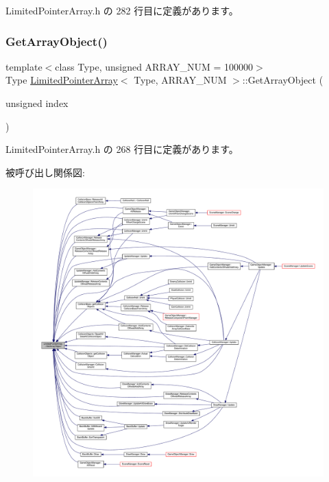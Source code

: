  Limited\+Pointer\+Array.\+h の 282 行目に定義があります。

\mbox{\label{class_limited_pointer_array_aae48443929a3766e602eb96f515c3a34}} 
\subsubsection{\texorpdfstring{Get\+Array\+Object()}{GetArrayObject()}}
{\footnotesize\ttfamily template$<$class Type, unsigned A\+R\+R\+A\+Y\+\_\+\+N\+UM = 100000$>$ \\
Type \mbox{\hyperlink{class_limited_pointer_array}{Limited\+Pointer\+Array}}$<$ Type, A\+R\+R\+A\+Y\+\_\+\+N\+UM $>$\+::Get\+Array\+Object (\begin{DoxyParamCaption}\item[{unsigned}]{index }\end{DoxyParamCaption})\hspace{0.3cm}{\ttfamily [inline]}}



 Limited\+Pointer\+Array.\+h の 268 行目に定義があります。

被呼び出し関係図\+:
\nopagebreak
\begin{figure}[H]
\begin{center}
\leavevmode
\includegraphics[width=350pt]{class_limited_pointer_array_aae48443929a3766e602eb96f515c3a34_icgraph}
\end{center}
\end{figure}
\mbox{\label{class_limited_pointer_array_a4c070b87cde4d2ea173aa28918af6223}} 
